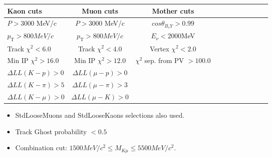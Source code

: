 \documentclass{beamer}
\begin{document}
{{  
  \begin{tabular}{l*{9}{c}r}
Kaon cuts& Muon cuts & Mother cuts   \\
\hline
$P > 3000$ MeV/c & $P > 3000$ MeV/c & $cos \theta_{B_{s}Y} > 0.99$  \\
$p_{\text{T}} > 800 MeV/c $        &$p_{\text{T}} > 800 MeV/c$ & $E_{\nu} < 2000 $MeV     \\
Track $\chi^{2} <  6.0 $        & Track $\chi^{2} <  4.0 $ & Vertex $\chi^{2} < 2.0$  \\ 
Min IP $\chi^{2} > 16.0$ & Min IP $\chi^{2} > 12.0$ &  $\chi^{2}$ sep. from PV $> 100.0$\\
$\Delta LL(K-p) > 0$ & $\Delta LL(\mu-p) > 0$&  \\
$\Delta LL(K-\pi) > 5 $ & $\Delta LL(\mu-\pi) > 3$& \\
$\Delta LL(K-\mu) > 0 $ & $\Delta LL(\mu-K) > 0$&
\end{tabular}

\begin{itemize}
 \setlength{\itemsep}{5pt}
\item StdLooseMuons and StdLooseKaons selections also used.
\item Track Ghost probability $< 0.5$
\item Combination cut: $1500 MeV/c^{2} \leq M_{K\mu} \leq 5500 MeV/c^{2}$.
\end{itemize}

}


}
\end{document}
